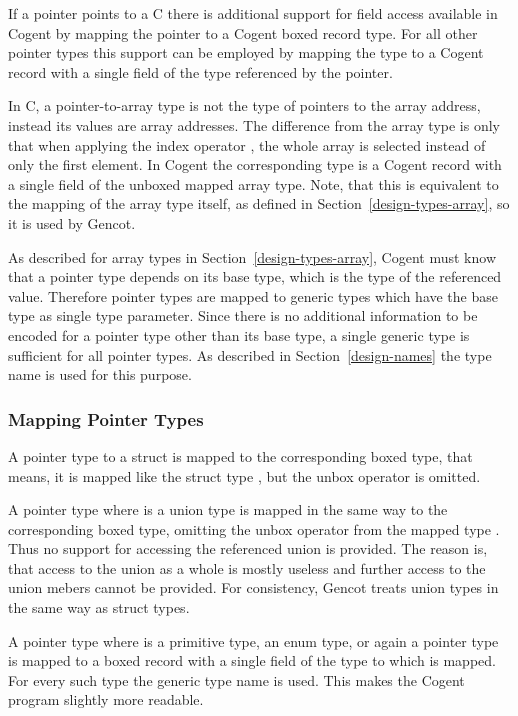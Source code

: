 If a pointer points to a C  there is additional support for field access available in Cogent by 
mapping the pointer to a Cogent boxed record type. For all other pointer types this support can be employed by
mapping the type to a Cogent record with a single field of the type referenced by the pointer.

In C, a pointer-to-array type is not the type of pointers to the array address, instead its values are array addresses.
The difference from the array type is only that when applying the index operator \code{[]}, the whole array is
selected instead of only the first element. In Cogent the corresponding type is a Cogent record with a single
field of the unboxed mapped array type. Note, that this is equivalent to the mapping of the array type itself, as defined
in Section~\ref{design-types-array}, so it is used by Gencot.

As described for array types in Section~\ref{design-types-array}, Cogent must know that a pointer type depends on 
its base type, which is the type of the referenced value. Therefore pointer types are mapped to generic types which
have the base type as single type parameter. Since there is no additional information to be encoded for a pointer
type other than its base type, a single generic type is sufficient for all pointer types. As described in 
Section~\ref{design-names} the type name  is used for this purpose.

\subsubsection{Mapping Pointer Types}

A pointer type  to a struct is mapped to the corresponding boxed type, 
that means, it is mapped like the struct type , but the unbox operator is omitted.

A pointer type  where  is a union type is mapped in the same way to the corresponding
boxed type, omitting the unbox operator from the mapped type . Thus no support for accessing
the referenced union is provided. The reason is, that access to the union as a whole is mostly useless
and further access to the union mebers cannot be provided. For consistency, Gencot treats union types
in the same way as struct types.

A pointer type  where  is a primitive type, an enum type, 
or again a pointer type is mapped to a boxed record with a single field  of the type  to which  is 
mapped. For every such type the generic type  name is used. This makes the 
Cogent program slightly more readable. 

